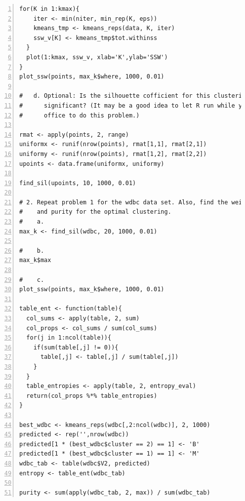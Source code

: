 \documentclass[11pt]{article}
\begin{document}
\begin{Verbatim}[numbers=left]
  for(K in 1:kmax){
    iter <- min(niter, min_rep(K, eps))
    kmeans_tmp <- kmeans_reps(data, K, iter)
    ssw_v[K] <- kmeans_tmp$tot.withinss
  }
  plot(1:kmax, ssw_v, xlab='K',ylab='SSW')
}
plot_ssw(points, max_k$where, 1000, 0.01)

#   d. Optional: Is the silhouette cofficient for this clustering statistically 
#      significant? (It may be a good idea to let R run while you're out of the 
#      office to do this problem.)

rmat <- apply(points, 2, range)
uniformx <- runif(nrow(points), rmat[1,1], rmat[2,1])
uniformy <- runif(nrow(points), rmat[1,2], rmat[2,2])
upoints <- data.frame(uniformx, uniformy)

find_sil(upoints, 10, 1000, 0.01)

# 2. Repeat problem 1 for the wdbc data set. Also, find the weighted entropy 
#    and purity for the optimal clustering. 
#    a. 
max_k <- find_sil(wdbc, 20, 1000, 0.01)

#    b. 
max_k$max

#    c. 
plot_ssw(points, max_k$where, 1000, 0.01)

table_ent <- function(table){
  col_sums <- apply(table, 2, sum)
  col_props <- col_sums / sum(col_sums)
  for(j in 1:ncol(table)){
  	if(sum(table[,j] != 0)){
      table[,j] <- table[,j] / sum(table[,j])
  	}
  }
  table_entropies <- apply(table, 2, entropy_eval)
  return(col_props %*% table_entropies)
}

best_wdbc <- kmeans_reps(wdbc[,2:ncol(wdbc)], 2, 1000)
predicted <- rep('',nrow(wdbc))
predicted[1 * (best_wdbc$cluster == 2) == 1] <- 'B'
predicted[1 * (best_wdbc$cluster == 1) == 1] <- 'M'
wdbc_tab <- table(wdbc$V2, predicted)
entropy <- table_ent(wdbc_tab)

purity <- sum(apply(wdbc_tab, 2, max)) / sum(wdbc_tab)
\end{Verbatim}
\end{document}
